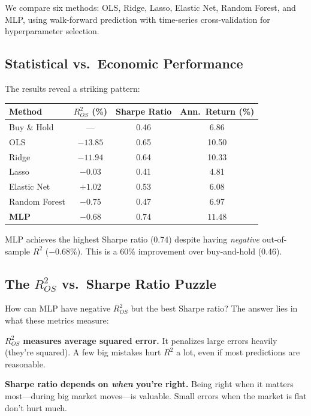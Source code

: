\documentclass[11pt,a4paper]{article}
\begin{document}
We compare six methods: OLS, Ridge, Lasso, Elastic Net, Random Forest, and MLP, using walk-forward prediction with time-series cross-validation for hyperparameter selection.

\subsection{Statistical vs.\ Economic Performance}

The results reveal a striking pattern:

\begin{center}
\begin{tabular}{lccc}
\toprule
\textbf{Method} & \textbf{$R^2_{OS}$ (\%)} & \textbf{Sharpe Ratio} & \textbf{Ann.\ Return (\%)} \\
\midrule
Buy \& Hold & --- & 0.46 & 6.86 \\
\midrule
OLS & $-13.85$ & 0.65 & 10.50 \\
Ridge & $-11.94$ & 0.64 & 10.33 \\
Lasso & $-0.03$ & 0.41 & 4.81 \\
Elastic Net & $+1.02$ & 0.53 & 6.08 \\
\midrule
Random Forest & $-0.75$ & 0.47 & 6.97 \\
\midrule
\textbf{MLP} & $\mathbf{-0.68}$ & $\mathbf{0.74}$ & $\mathbf{11.48}$ \\
\bottomrule
\end{tabular}
\end{center}

MLP achieves the highest Sharpe ratio (0.74) despite having \textit{negative} out-of-sample $R^2$ ($-0.68\%$). This is a 60\% improvement over buy-and-hold (0.46).

\subsection{The $R^2_{OS}$ vs.\ Sharpe Ratio Puzzle}

How can MLP have negative $R^2_{OS}$ but the best Sharpe ratio? The answer lies in what these metrics measure:

\textbf{$R^2_{OS}$ measures average squared error.} It penalizes large errors heavily (they're squared). A few big mistakes hurt $R^2$ a lot, even if most predictions are reasonable.

\textbf{Sharpe ratio depends on \textit{when} you're right.} Being right when it matters most---during big market moves---is valuable. Small errors when the market is flat don't hurt much.
\end{document}
